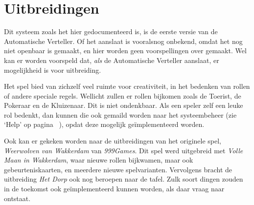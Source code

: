\documentclass[12pt]{article}
\begin{document}
\section{Uitbreidingen}

  Dit systeem zoals het hier gedocumenteerd is, is de eerste versie van de Automatische Verteller. Of het aanslaat is vooralsnog onbekend, omdat het nog niet openbaar is gemaakt, en hier worden geen voorspellingen over gemaakt. Wel kan er worden voorspeld dat, \emph{als} de Automatische Verteller aanslaat, er mogelijkheid is voor uitbreiding. 
  
  Het spel bied van zichzelf veel ruimte voor creativiteit, in het bedenken van rollen of andere speciale regels. Wellicht zullen er rollen bijkomen zoals de Toerist, de Pokeraar en de Kluizenaar. Dit is niet ondenkbaar. Als een speler zelf een leuke rol bedenkt, dan kunnen die ook gemaild worden naar het systeembeheer (zie `Help' op pagina~\pageref{subsec:help} ), opdat deze mogelijk ge\"implementeerd worden.
  
  Ook kan er gekeken worden naar de uitbreidingen van het originele spel, \emph{Weerwolven van Wakkerdam} van \emph{999Games}. Dit spel werd uitgebreid met \emph{Volle Maan in Wakkerdam}, waar nieuwe rollen bijkwamen, maar ook gebeurteniskaarten, en meerdere nieuwe spelvarianten. Vervolgens bracht de uitbreiding \emph{Het Dorp} ook nog beroepen naar de tafel. Zulk soort dingen zouden in de toekomst ook ge\"implementeerd kunnen worden, als daar vraag naar ontstaat.
\end{document}
